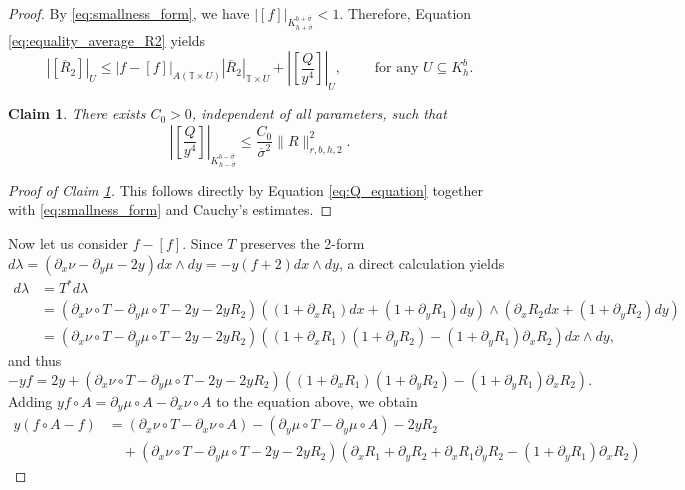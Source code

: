 \documentclass[10pt]{article}
\newtheorem{claim}{Claim}
\newcommand{\T}{\mathbb{T}}
\begin{document}
\begin{proof}
 By \eqref{eq:smallness_form}, we have $|[f]|_{K_{h + \overline \sigma}^{b + \overline\sigma}} < 1$. Therefore, Equation \eqref{eq:equality_average_R2} yields
 \begin{equation}
\label{eq:R2_average}
\left|\left[\overline{R}_2\right] \right|_{U} \leq  \left| f - [f]\right|_{A(\T \times U)} \left| \overline{R}_2 \right|_{\T \times U} +  \left| \left[ \frac{Q}{y^4} \right]\right|_{U}, \qquad \text{ for any } U \subseteq K_h^b.
\end{equation}


\begin{claim}
\label{cl:bounds_Q}
    There exists $C_0 > 0$, independent of all parameters, such that 
 \begin{equation*}
 \label{eq:bound_quadratic_terms_initial}
     \left| \left[ \frac{Q}{y^4} \right]\right|_{K_{h - \overline\sigma}^{b - \overline\sigma}} \leq  \frac{C_0}{\overline\sigma^2}\big\|R\big\|_{r, b, h,2}^2.
 \end{equation*} 
\end{claim}
\begin{proof}[Proof of Claim \ref{cl:bounds_Q}]
    This follows directly by Equation \eqref{eq:Q_equation} together with \eqref{eq:smallness_form} and Cauchy's estimates.%
\end{proof}

Now let us consider $f - [f]$. Since $T$ preserves the 2-form $d\lambda = (\partial_x \nu - \partial_y \mu - 2y)dx \wedge dy = -y(f + 2)dx\wedge dy$, a direct calculation yields
            \begin{align*}
        d\lambda & = T^*d\lambda  \\
        & = (\partial_x\nu \circ T -  \partial_y\mu \circ T -2y -2 yR_2)((1  +  \partial_xR_1)dx + (1 + \partial_yR_1)dy)\wedge(\partial_xR_2dx + (1 + \partial_yR_2)dy)\\
        & = (\partial_x\nu \circ T -  \partial_y\mu \circ T -2y -2 yR_2)((1  +  \partial_xR_1)(1 + \partial_yR_2) - (1 + \partial_yR_1)\partial_xR_2)dx\wedge dy,
    \end{align*}
and thus 
\begin{equation*}
    \label{eq:equality_difference}
    -yf  = 2y + (\partial_x\nu \circ T -  \partial_y\mu \circ T -2y -2 yR_2)((1  +  \partial_xR_1)(1 + \partial_yR_2) - (1 + \partial_yR_1)\partial_xR_2).
\end{equation*}
Adding $yf \circ A = \partial_y \mu \circ A - \partial_x \nu \circ A$ to the equation above, we obtain
\begin{align*}
       y(f \circ A - f) &=  (\partial_x\nu \circ T - \partial_x\nu \circ A) -  (\partial_y\mu \circ T - \partial_y\mu \circ A)  -2 yR_2 \\
      & \quad + (\partial_x\nu \circ T -  \partial_y\mu \circ T -2y -2 yR_2)(  \partial_xR_1 +\partial_yR_2 + \partial_xR_1 \partial_yR_2- (1 + \partial_yR_1)\partial_xR_2)
    \end{align*}


\end{proof}
\end{document}
